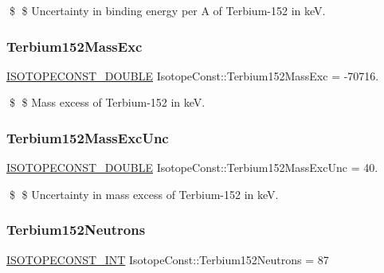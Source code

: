 \$ \$ Uncertainty in binding energy per A of Terbium-\/152 in keV. \mbox{\label{group___isotope_const-_terbium-_tb152_ga27305763a969a2954fe129cad439f58e}} 
\subsubsection{\texorpdfstring{Terbium152\+Mass\+Exc}{Terbium152MassExc}}
{\footnotesize\ttfamily \mbox{\hyperlink{group___isotope_const-_macros_ga8f45a7272ce02c0b4c65c44636ed719a}{I\+S\+O\+T\+O\+P\+E\+C\+O\+N\+S\+T\+\_\+\+D\+O\+U\+B\+LE}} Isotope\+Const\+::\+Terbium152\+Mass\+Exc = -\/70716.}

\$ \$ Mass excess of Terbium-\/152 in keV. \mbox{\label{group___isotope_const-_terbium-_tb152_ga85d1b1e2ec510e782707c48f2f52a4b5}} 
\subsubsection{\texorpdfstring{Terbium152\+Mass\+Exc\+Unc}{Terbium152MassExcUnc}}
{\footnotesize\ttfamily \mbox{\hyperlink{group___isotope_const-_macros_ga8f45a7272ce02c0b4c65c44636ed719a}{I\+S\+O\+T\+O\+P\+E\+C\+O\+N\+S\+T\+\_\+\+D\+O\+U\+B\+LE}} Isotope\+Const\+::\+Terbium152\+Mass\+Exc\+Unc = 40.}

\$ \$ Uncertainty in mass excess of Terbium-\/152 in keV. \mbox{\label{group___isotope_const-_terbium-_tb152_ga7084ce1979962d273910095e5ab62c83}} 
\subsubsection{\texorpdfstring{Terbium152\+Neutrons}{Terbium152Neutrons}}
{\footnotesize\ttfamily \mbox{\hyperlink{group___isotope_const-_macros_ga5f18360b3e99483a35c32d789e62621c}{I\+S\+O\+T\+O\+P\+E\+C\+O\+N\+S\+T\+\_\+\+I\+NT}} Isotope\+Const\+::\+Terbium152\+Neutrons = 87}

